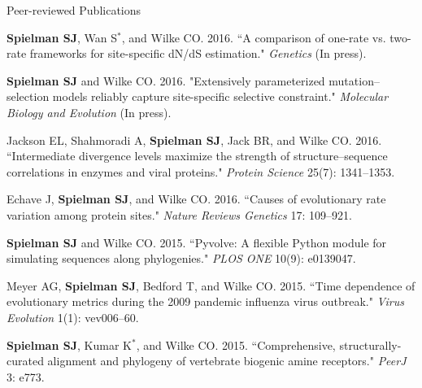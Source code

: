 \documentclass{resume} %
\begin{document}
\vspace*{0.35cm}
\begin{rSection}{Peer-reviewed Publications}
\vspace*{0.25cm}

\begin{etaremune}[leftmargin=1.5em]
\item \textbf{Spielman SJ}, Wan S$^\ast$, and Wilke CO. 2016. ``A comparison of one-rate vs. two-rate frameworks for site-specific dN/dS estimation." \emph{Genetics} (In press).\\


\item \textbf{Spielman SJ} and Wilke CO. 2016. "Extensively parameterized mutation--selection models reliably capture site-specific selective constraint." \emph{Molecular Biology and Evolution} (In press).\\


\item Jackson EL, Shahmoradi A, \textbf{Spielman SJ}, Jack BR, and Wilke CO. 2016. ``Intermediate divergence levels maximize the strength of structure--sequence correlations in enzymes and viral proteins." \emph{Protein Science} 25(7): 1341--1353.\\


\item Echave J, \textbf{Spielman SJ}, and Wilke CO. 2016. ``Causes of evolutionary rate variation among protein sites." \emph{Nature Reviews Genetics} 17: 109--921.\\


\item \textbf{Spielman SJ} and Wilke CO. 2015. ``Pyvolve: A flexible Python module for simulating sequences along phylogenies." \emph{PLOS ONE} 10(9): e0139047.\\


\item Meyer AG, \textbf{Spielman SJ}, Bedford T, and Wilke CO. 2015. ``Time dependence of evolutionary metrics during the 2009 pandemic influenza virus outbreak." \emph{Virus Evolution} 1(1): vev006--60. \\


\item \textbf{Spielman SJ}, Kumar K$^\ast$, and Wilke CO. 2015. ``Comprehensive, structurally-curated alignment and phylogeny of vertebrate biogenic amine receptors." \emph{PeerJ} 3: e773. \\



\end{etaremune}
\end{rSection}
\end{document}

